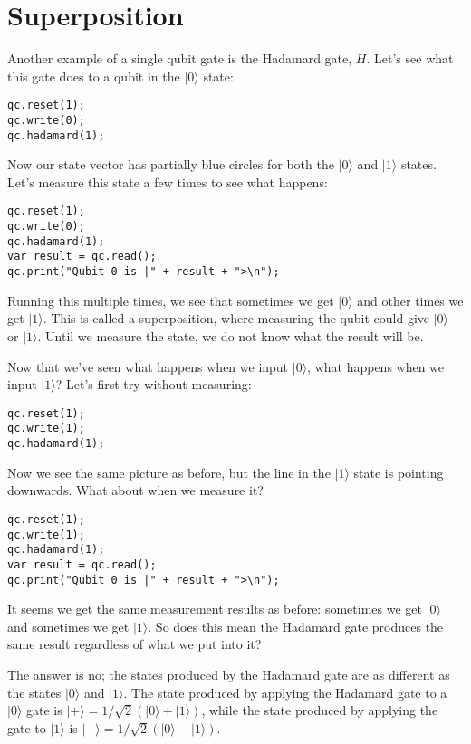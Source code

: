 \documentclass[twocolumn]{article}
\begin{document}
\section{Superposition}
\label{sec:superposition}

Another example of a single qubit gate is the Hadamard gate, $H$. Let's see what this gate does to a qubit in the $|0\rangle$ state:

\begin{lstlisting}
qc.reset(1);
qc.write(0);
qc.hadamard(1);
\end{lstlisting}

Now our state vector has partially blue circles for both the $|0\rangle$ and $|1\rangle$ states. Let's measure this state a few times to see what happens:

\begin{lstlisting}
qc.reset(1);
qc.write(0);
qc.hadamard(1);
var result = qc.read();
qc.print("Qubit 0 is |" + result + ">\n");
\end{lstlisting}

Running this multiple times, we see that sometimes we get $|0\rangle$ and other times we get $|1\rangle$. This is called a superposition, where measuring the qubit could give $|0\rangle$ or $|1\rangle$. Until we measure the state, we do not know what the result will be.

Now that we've seen what happens when we input $|0\rangle$, what happens when we input $|1\rangle$? Let's first try without measuring:

\begin{lstlisting}
qc.reset(1);
qc.write(1);
qc.hadamard(1);
\end{lstlisting}

Now we see the same picture as before, but the line in the $|1\rangle$ state is pointing downwards. What about when we measure it?

\begin{lstlisting}
qc.reset(1);
qc.write(1);
qc.hadamard(1);
var result = qc.read();
qc.print("Qubit 0 is |" + result + ">\n");
\end{lstlisting}

It seems we get the same measurement results as before: sometimes we get $|0\rangle$ and sometimes we get $|1\rangle$. So does this mean the Hadamard gate produces the same result regardless of what we put into it?

The answer is no; the states produced by the Hadamard gate are as different as the states $|0\rangle$ and $|1\rangle$. The state produced by applying the Hadamard gate to a $|0\rangle$ gate is $|+\rangle = 1/\sqrt{2}(|0\rangle + |1\rangle)$, while the state produced by applying the gate to $|1\rangle$ is $|-\rangle = 1/\sqrt{2}(|0\rangle - |1\rangle)$.
\end{document}
